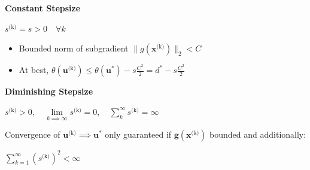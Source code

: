\documentclass[english]{latex4ei/latex4ei_sheet}
\begin{document}
\begin{sectionbox}
	\textbf{Constant Stepsize}
	\begin{center}
		$s^{\text{(k)}} = s > 0 \quad \forall k$
	\end{center}
	\begin{itemize}
		\item[] Bounded norm of subgradient $\| g(\bm{x}^{\text{(k)}}) \|_2 < C$
		\item[] At best, $\theta(\bm{u}^{\text{(k)}}) \leq \theta(\bm{u}^*) - s\frac{C^2}{2} = d^* - s\frac{C^2}{2}$
	\end{itemize}
	\vspace{0.5em}
	
	\textbf{Diminishing Stepsize}
	\begin{center}
		$s^{\text{(k)}} > 0, \quad \lim\limits_{k \implies \infty} s^{\text{(k)}} = 0, \quad \sum\limits_{k}^{\infty} s^{\text{(k)}} = \infty$
	\end{center}
	Convergence of $\bm{u}^{\text{(k)}} \implies \bm{u}^*$ only guaranteed if $\bm{g}(\bm{x}^{\text{(k)}})$ bounded and additionally:
	\begin{center}
		$\sum\limits_{k=1}^{\infty} (s^{\text{(k)}})^2 < \infty$
	\end{center}
	\vspace{0.5em}
\end{sectionbox}
\end{document}
